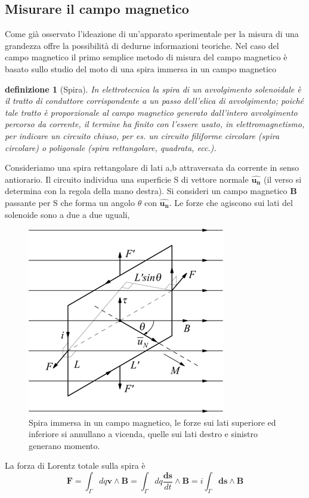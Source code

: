 \documentclass[10pt,a4paper]{article}
\newtheorem{definizione}{definizione}
\begin{document}
\subsection{Misurare il campo magnetico}
Come già osservato l'ideazione di un'apparato sperimentale per la misura di una grandezza offre la possibilità di dedurne informazioni teoriche. Nel caso del campo magnetico il primo semplice metodo di misura del campo magnetico è basato sullo studio del moto di una spira immersa in un campo magnetico
\begin{definizione}[Spira]
	 In elettrotecnica la spira di un avvolgimento solenoidale è il tratto di conduttore corrispondente a un passo dell’elica di avvolgimento; poiché tale tratto è proporzionale al campo magnetico generato dall'intero avvolgimento percorso da corrente, il termine ha finito con l’essere usato, in elettromagnetismo, per indicare un circuito chiuso, per es. un circuito filiforme circolare (spira circolare) o poligonale (spira rettangolare, quadrata, ecc.).
\end{definizione}
Consideriamo una spira rettangolare di lati a,b attraversata da corrente in senso antiorario. Il circuito individua una superficie S di vettore normale $\mathbf{\hat{u_n}}$ (il verso si determina con la regola della mano destra). Si consideri un campo magnetico $\mathbf{B}$ passante per S che forma un angolo $\theta$ con $\mathbf{\hat{u_n}}$. Le forze che agiscono sui lati del solenoide sono a due a due uguali, 
\begin{figure}[h!]
	\centering
	\includegraphics[width=0.5\linewidth]{images/spira_campo_magnetico}
	\caption{Spira immersa in un campo magnetico, le forze sui lati superiore ed inferiore si annullano a vicenda, quelle sui lati destro e sinistro generano momento.}
	\label{fig:spiracampomagnetico}
\end{figure}
\FloatBarrier
La forza di Lorentz totale sulla spira è
\[\mathbf{F}= \int_{\Gamma}dq\mathbf{v}\wedge\mathbf{B}= \int_{\Gamma}dq\frac{\mathbf{ds}}{dt}\wedge\mathbf{B}= i \int_{\Gamma}\mathbf{ds}\wedge\mathbf{B}\]
\end{document}
